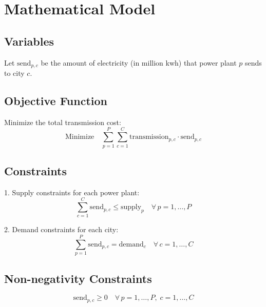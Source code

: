 \documentclass{article}
\begin{document}
\section*{Mathematical Model}

\subsection*{Variables}
Let \( \text{send}_{p,c} \) be the amount of electricity (in million kwh) that power plant \( p \) sends to city \( c \).

\subsection*{Objective Function}
Minimize the total transmission cost:
\[
\text{Minimize} \quad \sum_{p=1}^{P} \sum_{c=1}^{C} \text{transmission}_{p,c} \cdot \text{send}_{p,c}
\]

\subsection*{Constraints}

1. Supply constraints for each power plant:
   \[
   \sum_{c=1}^{C} \text{send}_{p,c} \leq \text{supply}_{p} \quad \forall \, p = 1, \ldots, P
   \]

2. Demand constraints for each city:
   \[
   \sum_{p=1}^{P} \text{send}_{p,c} = \text{demand}_{c} \quad \forall \, c = 1, \ldots, C
   \]

\subsection*{Non-negativity Constraints}
\[
\text{send}_{p,c} \geq 0 \quad \forall \, p = 1, \ldots, P, \; c = 1, \ldots, C
\]
\end{document}
